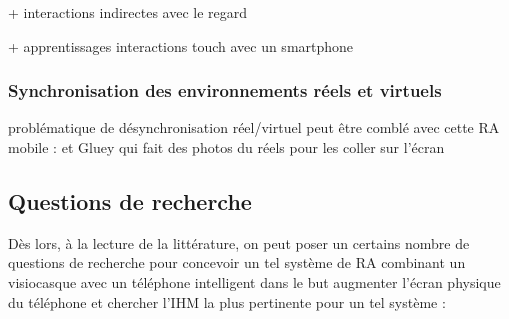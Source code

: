 + interactions indirectes avec le regard

+ apprentissages interactions touch avec un smartphone


\subsubsection{Synchronisation des environnements réels et virtuels}
problématique de désynchronisation réel/virtuel peut être comblé avec cette RA mobile : \cite{Chalon2004} et Gluey qui fait des photos du réels pour les coller sur l'écran


\subsection{Questions de recherche}
Dès lors, à la lecture de la littérature, on peut poser un certains nombre de questions de recherche pour concevoir un tel système de RA combinant un visiocasque avec un téléphone intelligent dans le but augmenter l'écran physique du téléphone et chercher l'IHM la plus pertinente pour un tel système :
